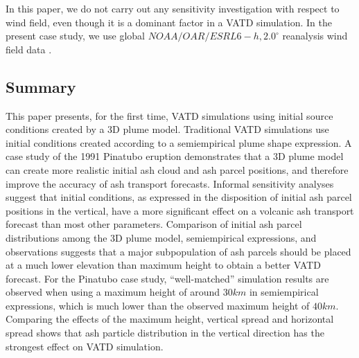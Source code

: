 \documentclass[utf8]{frontiersSCNS} %
\begin{document}
In this paper, we do not carry out any sensitivity investigation with respect to wind field, even though it is a dominant factor in a VATD simulation. In the present case study, we use global $NOAA/OAR/ESRL 6-h, 2.0^{\circ}$ reanalysis wind field data \citep{whitaker2004reanalysis, compo2006feasibility, compo2011twentieth}.

\subsection{Summary}

This paper presents, for the first time, VATD simulations using initial source conditions created by a 3D plume model. Traditional VATD simulations use initial conditions created according to a semiempirical plume shape expression. A case study of the 1991 Pinatubo eruption demonstrates that a 3D plume model can create more realistic initial ash cloud and ash parcel positions, and therefore improve the accuracy of ash transport forecasts. Informal sensitivity analyses suggest that initial conditions, as expressed in the disposition of initial ash parcel positions in the vertical, have a more significant effect on a volcanic ash transport forecast than most other parameters. Comparison of initial ash parcel distributions among the 3D plume model, semiempirical expressions, and observations suggests that a major subpopulation of ash parcels should be placed at a much lower elevation than maximum height to obtain a better VATD forecast. For the Pinatubo case study, ``well-matched'' simulation results are observed when using a maximum height of around $30 km$ in semiempirical expressions, which is much lower than the observed maximum height of $40 km$. Comparing the effects of the maximum height, vertical spread and horizontal spread shows that ash particle distribution in the vertical direction has the strongest effect on VATD simulation.
\end{document}
